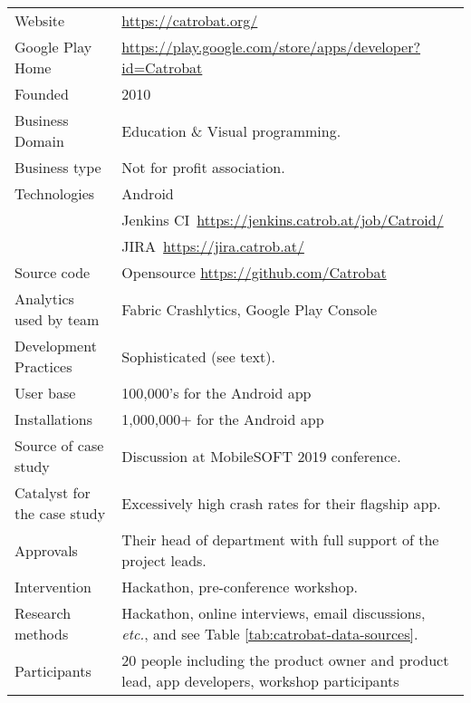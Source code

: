 {\renewcommand{\arraystretch}{0.8}%
\begin{table*}
    \centering
    \small
    \setlength{\tabcolsep}{6pt}
    \begin{tabular}{lp{11cm}}
       \toprule
       Website &\url{https://catrobat.org/} \\
       Google Play Home & \url{https://play.google.com/store/apps/developer?id=Catrobat} \\
       Founded & 2010 \\
       Business Domain & Education \& Visual programming. \\
       Business type & Not for profit association. \\
       Technologies  & Android \\
       & Jenkins CI~\url{https://jenkins.catrob.at/job/Catroid/}  \\
       & JIRA~\url{https://jira.catrob.at/} \\
       Source code  & Opensource \url{https://github.com/Catrobat} \\
       Analytics used by team & Fabric Crashlytics, Google Play Console \\
       Development Practices & Sophisticated (see text). \\
       \arrayrulecolor{blue!20}\midrule
       User base & 100,000's for the Android app \\
       Installations & 1,000,000+ for the Android app \\
       \arrayrulecolor{blue!20}\midrule
       Source of case study &Discussion at MobileSOFT 2019 conference. \\
       Catalyst for the case study &Excessively high crash rates for their flagship app. \\
       Approvals &Their head of department with full support of the project leads. \\
       \arrayrulecolor{blue!20}\midrule
       Intervention &Hackathon, pre-conference workshop. \\
       Research methods &Hackathon, online interviews, email discussions, \emph{etc.}, and see Table \ref{tab:catrobat-data-sources}. \\
       Participants &20 people including the product owner and product lead, app developers, workshop participants \\

\end{tabular}
\end{table*}}
